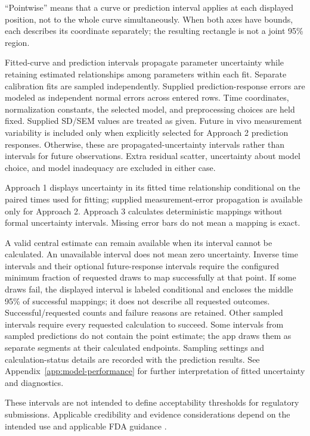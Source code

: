 ``Pointwise'' means that a curve or prediction interval applies at each displayed position, not to the whole curve simultaneously. When both axes have bounds, each describes its coordinate separately; the resulting rectangle is not a joint 95\% region.

Fitted-curve and prediction intervals propagate parameter uncertainty while retaining estimated relationships among parameters within each fit. Separate calibration fits are sampled independently. Supplied prediction-response errors are modeled as independent normal errors across entered rows. Time coordinates, normalization constants, the selected model, and preprocessing choices are held fixed. Supplied SD/SEM values are treated as given. Future in vivo measurement variability is included only when explicitly selected for Approach 2 prediction responses. Otherwise, these are propagated-uncertainty intervals rather than intervals for future observations. Extra residual scatter, uncertainty about model choice, and model inadequacy are excluded in either case.

Approach 1 displays uncertainty in its fitted time relationship conditional on the paired times used for fitting; supplied measurement-error propagation is available only for Approach 2. Approach 3 calculates deterministic mappings without formal uncertainty intervals. Missing error bars do not mean a mapping is exact.

A valid central estimate can remain available when its interval cannot be calculated. An unavailable interval does not mean zero uncertainty. Inverse time intervals and their optional future-response intervals require the configured minimum fraction of requested draws to map successfully at that point. If some draws fail, the displayed interval is labeled conditional and encloses the middle 95\% of successful mappings; it does not describe all requested outcomes. Successful/requested counts and failure reasons are retained. Other sampled intervals require every requested calculation to succeed. Some intervals from sampled predictions do not contain the point estimate; the app draws them as separate segments at their calculated endpoints. Sampling settings and calculation-status details are recorded with the prediction results. See Appendix~\ref{app:model-performance} for further interpretation of fitted uncertainty and diagnostics.

These intervals are not intended to define acceptability thresholds for regulatory submissions. Applicable credibility and evidence considerations depend on the intended use and applicable FDA guidance \cite{fda_modeling_guidance,fda_reporting_guidance}.

